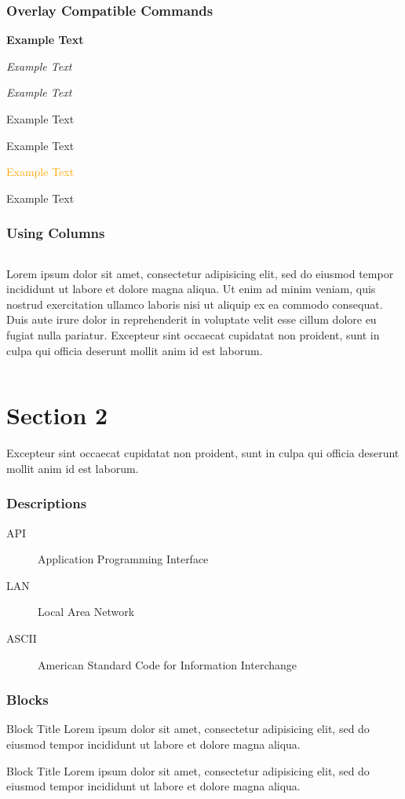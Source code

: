 \documentclass{beamer}
\begin{document}
\begin{frame}
\frametitle{Overlay Compatible Commands}
\textbf<2>{Example Text}

\textit<3>{Example Text}

\textsl<4>{Example Text}

\textrm<5>{Example Text}

\textsf<6>{Example Text}

\textcolor<7>{orange}{Example Text}

\alert<8>{Example Text}

\end{frame}

\begin{frame}
\label{columns}
\frametitle{Using Columns}
\begin{columns}
Lorem ipsum dolor sit amet, consectetur adipisicing elit, sed do eiusmod tempor incididunt ut labore et dolore magna aliqua. Ut enim ad minim veniam, quis nostrud exercitation ullamco laboris nisi ut aliquip ex ea commodo consequat. Duis aute irure dolor in reprehenderit in voluptate velit esse cillum dolore eu fugiat nulla pariatur. Excepteur sint occaecat cupidatat non proident, sunt in culpa qui officia deserunt mollit anim id est laborum.
\end{columns}
\end{frame}

\section{Section 2}

\begin{frame}
Excepteur sint occaecat cupidatat non proident, sunt in culpa qui officia deserunt mollit anim id est laborum.
\end{frame}

\begin{frame}
\frametitle{Descriptions}
\begin{description}
\item[API] Application Programming Interface
\item[LAN] Local Area Network
\item[ASCII] American Standard Code for Information Interchange
\end{description}
\end{frame}
    
\begin{frame}
\frametitle{Blocks}
\begin{block}{Block Title}
Lorem ipsum dolor sit amet, consectetur adipisicing elit, sed do eiusmod tempor incididunt ut labore et dolore magna aliqua.
\end{block}
\begin{alertblock}{Block Title}
Lorem ipsum dolor sit amet, consectetur adipisicing elit, sed do eiusmod tempor incididunt ut labore et dolore magna aliqua.
\end{alertblock}
\end{frame}
\end{document}
